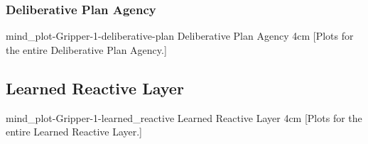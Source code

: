 {\newpage
  \noindent\begin{minipage}{\textwidth}
    \subsubsection{Deliberative Plan Agency}
    \experimentcausegroupplots{\dataappendixmaxtime}
                           {\dataappendixexperimentonemaxtime}
                           {\dataappendixexperimenttwomaxtime}
                           {\dataappendixexperimentthreemaxtime}
                           {\dataappendixexperimentonename}
                           {\dataappendixexperimenttwoname}
                           {\dataappendixexperimentthreename}
                           {\dataappendixexperimentoneprettyname}
                           {\dataappendixexperimenttwoprettyname}
                           \experimentcausegroupplotscontinued{\dataappendixexperimentthreeprettyname}
                                                              {mind_plot-Gripper-1-deliberative-plan}
                                                              {Deliberative Plan Agency}
                                                              {\experimentdatacommontablereference}
                                                              {4cm}
    \experimentdatablocksworldexample
    [Plots for the entire
      Deliberative Plan Agency.]{}
  \label{figure:mind_plot-Gripper-1-deliberative-plan}
  \end{minipage}
}
{\newpage
  \noindent\begin{minipage}{\textwidth}
    \subsection{Learned Reactive Layer}
    \experimentcausegroupplots{\dataappendixmaxtime}
                           {\dataappendixexperimentonemaxtime}
                           {\dataappendixexperimenttwomaxtime}
                           {\dataappendixexperimentthreemaxtime}
                           {\dataappendixexperimentonename}
                           {\dataappendixexperimenttwoname}
                           {\dataappendixexperimentthreename}
                           {\dataappendixexperimentoneprettyname}
                           {\dataappendixexperimenttwoprettyname}
                           \experimentcausegroupplotscontinued{\dataappendixexperimentthreeprettyname}
                                                              {mind_plot-Gripper-1-learned_reactive}
                                                              {Learned Reactive Layer}
                                                              {\experimentdatacommontablereference}
                                                              {4cm}
    \experimentdatablocksworldexample
    [Plots for the entire
      Learned Reactive Layer.]{}
  \label{figure:mind_plot-Gripper-1-learned_reactive}
  \end{minipage}
}
